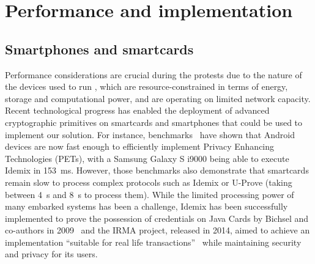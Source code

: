 \section{Performance and implementation}
\label{PerformanceAnalysis}

\subsection{Smartphones and smartcards}
Performance considerations are crucial during the protests due to the nature of the devices used to run \CROCUS, which are resource-constrained in terms of energy, storage and computational power, and are operating on limited network capacity. 
Recent technological progress has enabled the deployment of advanced cryptographic primitives on smartcards and smartphones that could be used to implement our solution.
For instance, benchmarks~\cite{Benchmarking} have shown that Android devices are now fast enough to efficiently implement Privacy Enhancing Technologies (PETs), with a Samsung Galaxy S i9000 being able to execute Idemix in \SI{153}{\milli\second}. 
However, those benchmarks also demonstrate that smartcards remain slow to process complex protocols such as Idemix or U-Prove (taking between \SI{4}{\second} and \SI{8}{\second} to process them). 
While the limited processing power of many embarked systems has been a challenge, Idemix has been successfully implemented to prove the possession of credentials on Java Cards by Bichsel and co-authors in 2009~\cite{Bichsel} and the IRMA project, released in 2014, aimed to achieve an implementation ``suitable for real life transactions''~\cite{IRMA} while maintaining security and privacy for its users. 

